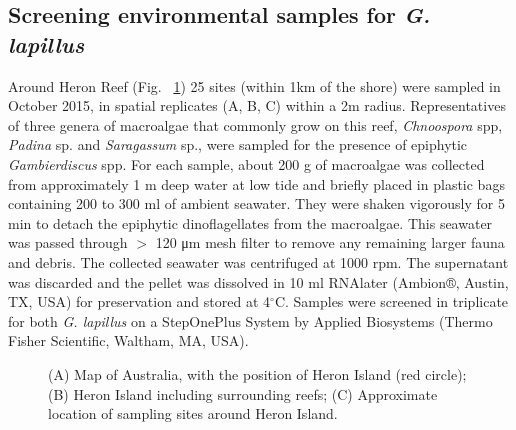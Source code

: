 \documentclass[10pt,letterpaper]{article}
\begin{document}
\subsection*{Screening environmental samples for \emph{G. lapillus}}
\FloatBarrier
Around Heron Reef (Fig. ~\ref{fig:samplesites}) 25 sites (within 1km of the shore) were sampled in October 2015, in spatial replicates (A, B, C) within a 2m radius. 
Representatives of three genera of macroalgae that commonly grow on this reef, \textit{Chnoospora} spp, \textit{Padina} sp. and \textit{Saragassum} sp., were sampled for the presence of epiphytic \emph{Gambierdiscus} spp. For each sample, about 200 g of macroalgae was collected from approximately 1 m deep water at low tide and briefly placed in plastic bags containing 200 to 300 ml of ambient seawater. 
They were shaken vigorously for 5 min to detach the epiphytic dinoflagellates from the macroalgae. 
This seawater was passed through $>$ 120 μm mesh filter to remove any remaining larger fauna and debris. 
The collected seawater was centrifuged at 1000 rpm. The supernatant was discarded and the pellet was dissolved in 10 ml RNAlater (Ambion®, Austin, TX, USA) for preservation and stored at 4$^{\circ}$C.
Samples were screened in triplicate for both \emph{G. lapillus} on a StepOnePlus System by Applied Biosystems (Thermo Fisher Scientific, Waltham, MA, USA).
\begin{figure} 
\caption{(A) Map of Australia, with the position of Heron Island (red circle); (B) Heron Island including surrounding reefs; (C) Approximate location of sampling sites around Heron Island.} 
\label{fig:samplesites}
\end{figure} 
\end{document}
